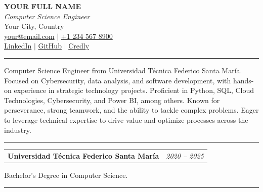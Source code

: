 \documentclass[11pt, a4paper]{article}
\begin{document}
\begin{center}
  {\LARGE\bfseries YOUR FULL NAME} \\
  \medskip
  {\itshape Computer Science Engineer} \\
  Your City, Country \\
  \href{mailto:your@email.com}{your@email.com} $|$ \href{tel:+12345678900}{+1 234 567 8900} \\
  \href{https://linkedin.com/in/your-profile}{\textcolor{linkblue}{LinkedIn}} $|$ \href{https://github.com/your-username}{\textcolor{linkblue}{GitHub}} $|$ \href{https://www.credly.com/users/your-profile/}{\textcolor{linkblue}{Credly}}
\end{center}

\vspace{8pt}


\vspace{6pt}\vspace{2pt}\hrule\vspace{4pt}

\justifying Computer Science Engineer from Universidad Técnica Federico Santa María. Focused on Cybersecurity, data analysis, and software development, with hands-on experience in strategic technology projects. Proficient in Python, SQL, Cloud Technologies, Cybersecurity, and Power BI, among others. Known for perseverance, strong teamwork, and the ability to tackle complex problems. Eager to leverage technical expertise to drive value and optimize processes across the industry.


\vspace{6pt}\vspace{2pt}\hrule\vspace{4pt}

\noindent\begin{tabularx}{\linewidth}{@{}X r@{}}
  \textbf{Universidad Técnica Federico Santa María} & \textit{2020 -- 2025} \\
\end{tabularx}
\noindent Bachelor's Degree in Computer Science.
\vspace{4pt}


\vspace{6pt}\vspace{2pt}\hrule\vspace{4pt}
\end{document}
